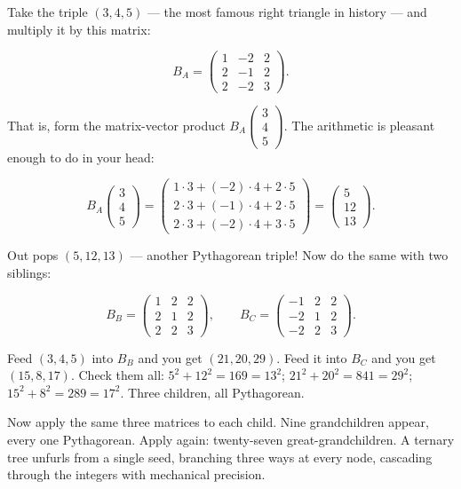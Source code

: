 Take the triple $(3, 4, 5)$ --- the most famous right triangle in history --- and multiply it by this matrix:

\[B_A = \begin{pmatrix} 1 & -2 & 2 \\ 2 & -1 & 2 \\ 2 & -2 & 3 \end{pmatrix}.\]

That is, form the matrix-vector product $B_A \begin{pmatrix} 3 \\ 4 \\ 5 \end{pmatrix}$. The arithmetic is pleasant enough to do in your head:

\[B_A \begin{pmatrix} 3 \\ 4 \\ 5 \end{pmatrix} = \begin{pmatrix} 1\cdot3 + (-2)\cdot4 + 2\cdot5 \\ 2\cdot3 + (-1)\cdot4 + 2\cdot5 \\ 2\cdot3 + (-2)\cdot4 + 3\cdot5 \end{pmatrix} = \begin{pmatrix} 5 \\ 12 \\ 13 \end{pmatrix}.\]

Out pops $(5, 12, 13)$ --- another Pythagorean triple! Now do the same with two siblings:

\[B_B = \begin{pmatrix} 1 & 2 & 2 \\ 2 & 1 & 2 \\ 2 & 2 & 3 \end{pmatrix}, \qquad B_C = \begin{pmatrix} -1 & 2 & 2 \\ -2 & 1 & 2 \\ -2 & 2 & 3 \end{pmatrix}.\]

Feed $(3, 4, 5)$ into $B_B$ and you get $(21, 20, 29)$. Feed it into $B_C$ and you get $(15, 8, 17)$. Check them all: $5^2 + 12^2 = 169 = 13^2$; $21^2 + 20^2 = 841 = 29^2$; $15^2 + 8^2 = 289 = 17^2$. Three children, all Pythagorean.

Now apply the same three matrices to each child. Nine grandchildren appear, every one Pythagorean. Apply again: twenty-seven great-grandchildren. A ternary tree unfurls from a single seed, branching three ways at every node, cascading through the integers with mechanical precision.

